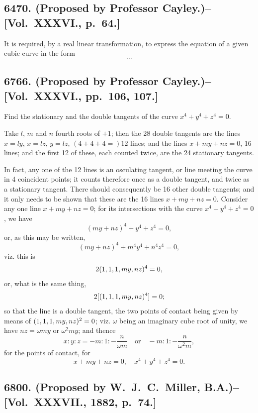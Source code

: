 \documentclass[11pt,a4paper]{book}
\begin{document}
\subsection*{6470. (Proposed by Professor Cayley.)\---[Vol.~XXXVI., p.~64.]}

It is required, by a real linear transformation, to express the equation of a given cubic curve in the form
\[
\ldots
\]

\subsection*{6766. (Proposed by Professor Cayley.)\---[Vol.~XXXVI., pp.~106, 107.]}

Find the stationary and the double tangents of the curve $x^4+y^4+z^4=0$.

\begin{solution}
Take $l$, $m$ and $n$ fourth roots of $+1$; then the 28 double tangents are the lines $x=ly$, $x=lz$, $y=lz$, $(4+4+4=)12$ lines; and the lines $x+my+nz=0$, 16 lines; and the first 12 of these, each counted twice, are the 24 stationary tangents.

In fact, any one of the 12 lines is an osculating tangent, or line meeting the curve in 4 coincident points; it counts therefore once as a double tangent, and twice as a stationary tangent. There should consequently be 16 other double tangents; and it only needs to be shown that these are the 16 lines $x+my+nz=0$. Consider any one line $x+my+nz=0$; for its intersections with the curve $x^4+y^4+z^4=0$, we have
\[
(my+nz)^4 + y^4 + z^4 = 0,
\]
or, as this may be written,
\[
(my+nz)^4 + m^4y^4 + n^4z^4 = 0,
\]
viz. this is
\[
2(1,1,1\char`\,my,nz)^4 = 0,
\]
or, what is the same thing,
\[
2[(1,1,1\char`\,my,nz)^4] = 0;
\]
so that the line is a double tangent, the two points of contact being given by means of $(1,1,1\char`\,my,nz)^2 = 0$; viz. $\omega$ being an imaginary cube root of unity, we have $nz = \omega my$ or $\omega^2 my$; and thence
\[
x : y : z = -m : 1 : -\frac{n}{\omega m} \quad\text{or}\quad -m : 1 : -\frac{n}{\omega^2 m},
\]
for the points of contact, for
\[
x+my+nz=0, \quad x^4+y^4+z^4=0.
\]
\end{solution}

\newpage

\subsection*{6800. (Proposed by W.~J.~C.~Miller, B.A.)\---[Vol.~XXXVII., 1882, p.~74.]}
\end{document}
